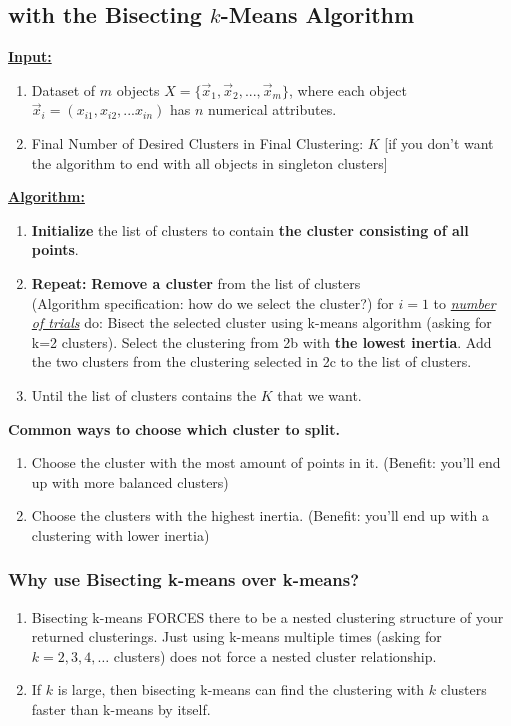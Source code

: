 \documentclass[11pt]{elegantbook}
\begin{document}
\subsection{with the Bisecting $k$-Means Algorithm}
\textbf{\underline{Input:}}
\begin{enumerate}[$\bullet$]
    \item Dataset of $m$ objects $X=\{\vec{x}_1,\vec{x}_2,...,\vec{x}_m\}$, where each object $\vec{x}_i=(x_{i1},x_{i2},...x_{in})$ has $n$ numerical attributes.
    \item Final Number of Desired Clusters in Final Clustering: $K$ [if you don't want the algorithm to end with all
    objects in singleton clusters]
\end{enumerate}
\textbf{\underline{Algorithm:}}
\begin{enumerate}[1.]
    \item \textbf{Initialize} the list of clusters to contain \textbf{the cluster consisting of all points}.
    \item \textbf{Repeat:}
    \subitem[a.] \textbf{Remove a cluster} from the list of clusters\\ (Algorithm specification: how do we select the cluster?)
    \subitem[b.] for $i = 1$ to \underline{\textit{number of trials}} do: Bisect the selected cluster using k-means algorithm (asking for k=2 clusters).
    \subitem[c.] Select the clustering from 2b with \textbf{the lowest inertia}.
    \subitem[d.] Add the two clusters from the clustering selected in 2c to the list of clusters.
    \item Until the list of clusters contains the $K$ that we want.
\end{enumerate}
\textbf{Common ways to choose which cluster to split.}
\begin{enumerate}[1.]
    \item Choose the cluster with the most amount of points in it. (Benefit: you'll end up with more balanced clusters)
    \item Choose the clusters with the highest inertia. (Benefit: you'll end up with a clustering with lower inertia)
\end{enumerate}

\subsubsection*{Why use Bisecting k-means over k-means?}
\begin{enumerate}[-]
    \item Bisecting k-means FORCES there to be a nested clustering structure of your returned clusterings. Just using k-means multiple times (asking for $k=2,3,4, \ldots$ clusters) does not force a nested cluster relationship.
    \item If $k$ is large, then bisecting k-means can find the clustering with $k$ clusters faster than k-means by itself.
\end{enumerate}
\end{document}
